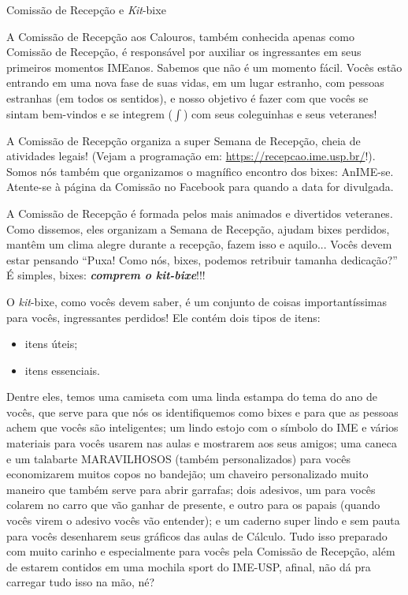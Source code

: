\begin{secao}{Comissão de Recepção e \textit{Kit}-bixe}

A Comissão de Recepção aos Calouros, também conhecida apenas como Comissão de
Recepção, é responsável por auxiliar os ingressantes em seus primeiros momentos
IMEanos. Sabemos que não é um momento fácil. Vocês estão entrando em uma nova fase
de suas vidas, em um lugar estranho, com pessoas estranhas (em todos os sentidos),
e nosso objetivo é fazer com que vocês se sintam bem-vindos e se integrem
($\int$) com seus coleguinhas e seus veteranes!

A Comissão de Recepção organiza a super Semana de Recepção, cheia de atividades
legais! (Vejam a programação em: \url{https://recepcao.ime.usp.br/}!).
Somos nós também que organizamos o magnífico encontro dos bixes: AnIME-se.
Atente-se à página da Comissão no Facebook para quando a data for divulgada. %

A Comissão de Recepção é formada pelos mais animados e divertidos veteranes. Como
dissemos, eles organizam a Semana de Recepção, ajudam bixes perdidos, mantêm um clima
alegre durante a recepção, fazem isso e aquilo...
Vocês devem estar pensando ``Puxa! Como nós, bixes, podemos retribuir
tamanha dedicação?'' É simples, bixes: {\bf\em comprem o \textit{kit}-bixe}!!!

O \textit{kit}-bixe, como vocês devem saber, é um conjunto de coisas
importantíssimas para vocês, ingressantes perdidos! Ele contém dois tipos de
itens:
\begin{itemize}
\item itens úteis;
\item itens essenciais.
\end{itemize} %
Dentre eles, temos uma camiseta com uma linda estampa do tema do ano de vocês,
que serve para que nós os identifiquemos como bixes e para que as pessoas
achem que vocês são inteligentes; um lindo estojo com o símbolo do IME e vários materiais
para vocês usarem nas aulas e mostrarem aos seus amigos; uma caneca e um talabarte MARAVILHOSOS
(também personalizados) para vocês economizarem muitos copos no bandejão; um
chaveiro personalizado muito maneiro que também serve para abrir garrafas;
dois adesivos, um para vocês colarem no carro que vão ganhar de presente, e outro
para os papais (quando vocês virem o adesivo vocês vão entender); e um caderno super
lindo e sem pauta para vocês desenharem seus gráficos das aulas de Cálculo. Tudo
isso preparado com muito carinho e especialmente para vocês pela Comissão de Recepção,
além de estarem contidos em uma mochila sport do IME-USP, afinal, não dá pra
carregar tudo isso na mão, né?


\end{secao}
